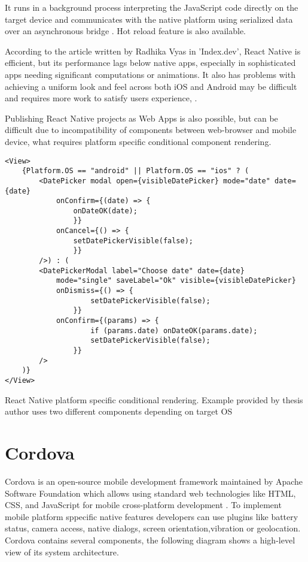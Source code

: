 It runs in a background process interpreting the JavaScript code directly on the target device and communicates with the native platform using serialized data over an asynchronous bridge \autocite{ReactNativeMedium}. Hot reload feature is also available.

According to the article written by Radhika Vyas  in 'Index.dev', React Native is efficient, but its performance lags below native apps, especially in sophisticated apps needing significant computations or animations. It also has problems with achieving a uniform look and feel across both iOS and Android may be difficult and requires more work to satisfy users experience, \textcite{Vyas}.

Publishing React Native projects as Web Apps is also possible, but can be difficult due to incompatibility of components between web-browser and mobile device, what requires platform specific conditional component rendering.



\begin{listing}[H]
\begin{verbatim}
<View>
    {Platform.OS == "android" || Platform.OS == "ios" ? (
        <DatePicker modal open={visibleDatePicker} mode="date" date={date}
            onConfirm={(date) => {
                onDateOK(date);
                }}
            onCancel={() => {
                setDatePickerVisible(false);
                }}
        />) : (
        <DatePickerModal label="Choose date" date={date}
            mode="single" saveLabel="Ok" visible={visibleDatePicker}
            onDismiss={() => {
                    setDatePickerVisible(false);
                }}
            onConfirm={(params) => {
                    if (params.date) onDateOK(params.date);
                    setDatePickerVisible(false);
                }}
        />
    )}
</View>
\end{verbatim}
\caption[React Native platform specific conditional rendering]{React Native platform specific conditional rendering. Example provided by thesis author uses two different components depending on target OS}
\end{listing}
                

\section{{Cordova}}
\label{sec:cordova}
Cordova is an open-source mobile development framework maintained by Apache Software Foundation which allows using standard web technologies like HTML, CSS, and JavaScript for mobile cross-platform development \autocite{CordovaDoc}. To implement mobile platform sppecific native features developers can use plugins like battery status, camera access, native dialogs, screen orientation,vibration or geolocation. Cordova contains several components, the following diagram shows a high-level view of its system architecture.

